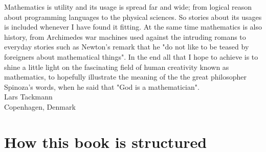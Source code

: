 \indent Mathematics is utility and its usage is spread far and wide; from logical reason about programming languages to the physical sciences. So stories about its usages is included whenever I have found it fitting. At the same time mathematics is also history, from Archimedes war machines used against the intruding romans to everyday stories such as Newton's remark that he "do not like to be teased by foreigners about mathematical things". In the end all that I hope to achieve is to shine a little light on the fascinating field of human creativity known as mathematics, to hopefully illustrate the meaning of the the great philosopher Spinoza's words, when he said that "God is a mathematician". \\
\flushright Lars Tackmann \\ Copenhagen, Denmark\flushleft

\section{How this book is structured}

